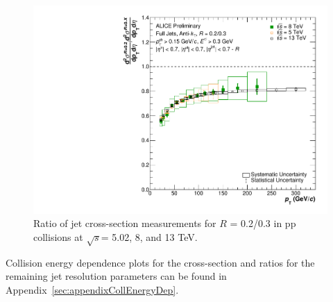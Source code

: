 \documentclass[ALICE]{ALICE_analysis_notes}
\newcommand{\s}{$\sqrt{s}$\xspace}
\newcommand{\pp}{pp\xspace}
\begin{document}
\begin{figure}[hbt!]
    \centering
    \includegraphics[width=\textwidth]{figures/EnergyComparisons/RatioComparison_R03.pdf}
    \caption{Ratio of jet cross-section measurements for $R$ = 0.2/0.3 in \pp collisions at \s = 5.02, 8, and 13 TeV.}
    \label{fig:ratioCompareR03}
\end{figure}

Collision energy dependence plots for the cross-section and ratios for the remaining jet resolution parameters can be found in Appendix~\ref{sec:appendixCollEnergyDep}.\clearpage{}
\end{document}
